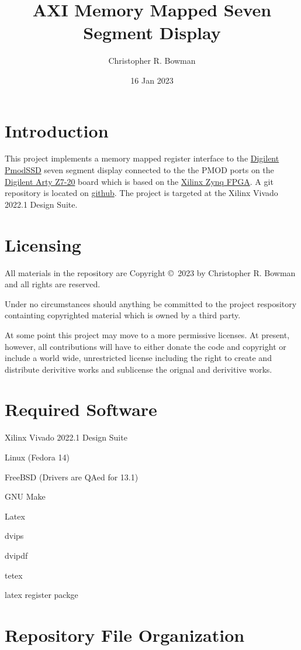 \documentclass{report}
\title{AXI Memory Mapped Seven Segment Display}
\author{Christopher R. Bowman}
\date{16 Jan 2023}
\begin{document}
\maketitle
\tableofcontents
\listoftables
\pagebreak
\pagestyle{headings}
\chapter{Introduction}
This project implements a memory mapped register interface to the 
\href{https://digilent.com/reference/pmod/pmodssd/reference-manual?redirect=1}
{Digilent PmodSSD} seven segment display connected to the the PMOD ports on the
\href{https://digilent.com/shop/arty-z7-zynq-7000-soc-development-board/}
{Digilent Arty Z7-20} board which is based on the
\href{http://www.xilinx.com/products/spartan6/index.htm} {Xilinx Zynq FPGA}.
A git repository is located on
\href{https://gihub.com/}
{github}.
The project is targeted at the Xilinx Vivado 2022.1 Design Suite.

\chapter{Licensing}
All materials in the repository are Copyright \copyright\ 2023 by
Christopher R. Bowman and all rights are reserved.

Under no circumstances should anything be committed to the
project respository containting copyrighted material which is
owned by a third party.

At some point this project may move to a more permissive licenses.
At present, however, all contributions will have to either donate
the code and copyright or include a world wide, unrestricted
license including the right to create and distribute derivitive
works and sublicense the orignal and derivitive works.

\chapter{Required Software}
Xilinx Vivado 2022.1 Design Suite

Linux (Fedora 14)

FreeBSD (Drivers are QAed for 13.1)

GNU Make

Latex

dvips

dvipdf

tetex

latex register packge

\chapter{Repository File Organization}
\end{document}
